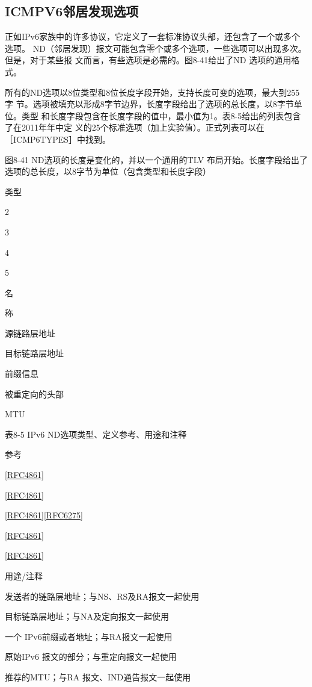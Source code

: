 \subsection{ICMPV6邻居发现选项}
正如IPv6家族中的许多协议，它定义了一套标准协议头部，还包含了一个或多个选项。
ND（邻居发现）报文可能包含零个或多个选项，一些选项可以出现多次。但是，对于某些报
文而言，有些选项是必需的。图8-41给出了ND 选项的通用格式。

所有的ND选项以8位类型和8位长度字段开始，支持长度可变的选项，最大到255字
节。选项被填充以形成8字节边界，长度字段给出了选项的总长度，以8字节单位。类型
和长度字段包含在长度字段的值中，最小值为1。表8-5给出的列表包含了在2011年年中定
义的25个标准选项（加上实验值）。正式列表可以在［ICMP6TYPES］中找到。

图8-41 ND选项的长度是变化的，并以一个通用的TLV 布局开始。长度字段给出了
选项的总长度，以8字节为单位（包含类型和长度字段）


类型

2

3

4

5

名

称

源链路层地址

目标链路层地址

前缀信息

被重定向的头部

MTU

表8-5 IPv6 ND选项类型、定义参考、用途和注释

参考

\href{https://www.rfc-editor.org/rfc/rfc4861}{[RFC4861]}

\href{https://www.rfc-editor.org/rfc/rfc4861}{[RFC4861]}

\href{https://www.rfc-editor.org/rfc/rfc4861}{[RFC4861]}\href{https://www.rfc-editor.org/rfc/rfc6275}{[RFC6275]}

\href{https://www.rfc-editor.org/rfc/rfc4861}{[RFC4861]}

\href{https://www.rfc-editor.org/rfc/rfc4861}{[RFC4861]}

用途/注释

发送者的链路层地址；与NS、RS及RA报文一起使用

目标链路层地址；与NA及定向报文一起使用

一个 IPv6前缀或者地址；与RA报文一起使用

原始IPv6 报文的部分；与重定向报文一起使用

推荐的MTU；与RA 报文、IND通告报文一起使用

